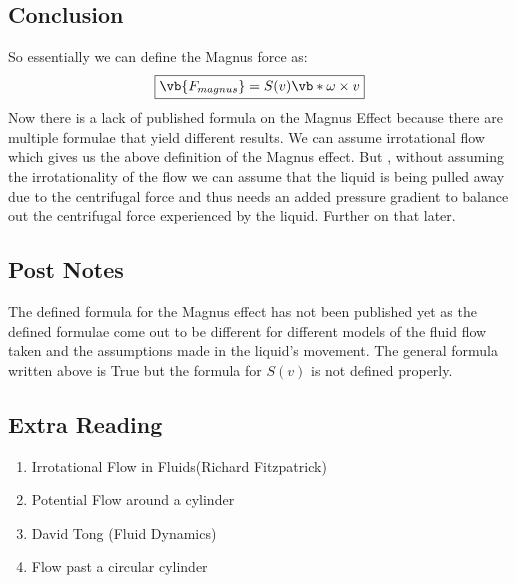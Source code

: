 \documentclass[a4paper]{article}
\begin{document}
\subsection{Conclusion}
So essentially we can define the Magnus force as:
\begin{align*}
\fbox{$\vb{F_{magnus}} = S(v)\vb*{\omega\times v}$}
\end{align*}
Now there is a lack of published formula on the Magnus Effect because there are multiple formulae that yield different results. We can assume irrotational flow which gives us the above definition of the Magnus effect. But , without assuming the irrotationality of the flow we can assume that the liquid is being pulled away due to the centrifugal force and thus needs an added pressure gradient to balance out the centrifugal force experienced by the liquid. Further on that later.
\subsection{Post Notes}
The defined formula for the Magnus effect has not been published yet as the defined formulae come out to be different for different models of the fluid flow taken and the assumptions made in the liquid's movement. The general formula written above is True but the formula for $S(v)$ is not defined properly.
\subsection{Extra Reading}
\begin{enumerate}
    \item Irrotational Flow in Fluids(Richard Fitzpatrick)
    \item Potential Flow around a cylinder
    \item David Tong (Fluid Dynamics)
    \item Flow past a circular cylinder
\end{enumerate}
\end{document}
